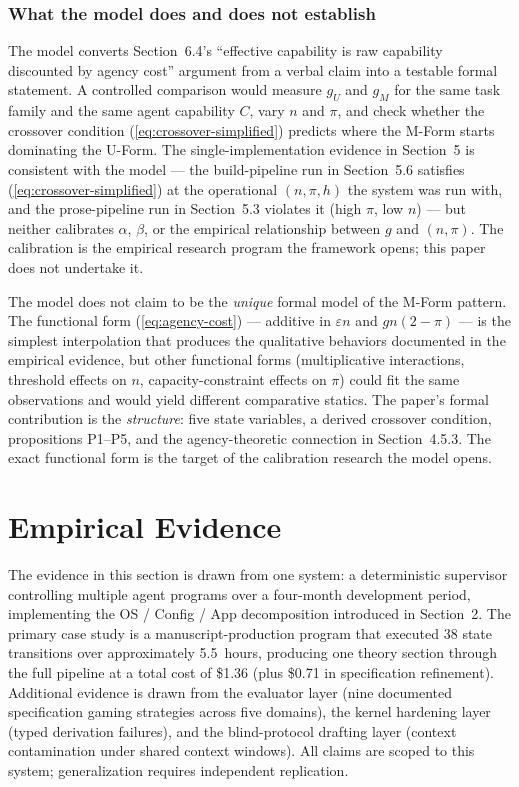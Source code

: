 \documentclass[11pt]{article}
\begin{document}
\subsubsection{What the model does and does not establish}

The model converts Section~6.4's ``effective capability is raw capability discounted by agency cost'' argument from a verbal claim into a testable formal statement. A controlled comparison would measure $g_U$ and $g_M$ for the same task family and the same agent capability $C$, vary $n$ and $\pi$, and check whether the crossover condition (\ref{eq:crossover-simplified}) predicts where the M-Form starts dominating the U-Form. The single-implementation evidence in Section~5 is consistent with the model --- the build-pipeline run in Section~5.6 satisfies (\ref{eq:crossover-simplified}) at the operational $(n, \pi, h)$ the system was run with, and the prose-pipeline run in Section~5.3 violates it (high $\pi$, low $n$) --- but neither calibrates $\alpha$, $\beta$, or the empirical relationship between $g$ and $(n, \pi)$. The calibration is the empirical research program the framework opens; this paper does not undertake it.

The model does not claim to be the \emph{unique} formal model of the M-Form pattern. The functional form (\ref{eq:agency-cost}) --- additive in $\varepsilon n$ and $g n (2 - \pi)$ --- is the simplest interpolation that produces the qualitative behaviors documented in the empirical evidence, but other functional forms (multiplicative interactions, threshold effects on $n$, capacity-constraint effects on $\pi$) could fit the same observations and would yield different comparative statics. The paper's formal contribution is the \emph{structure}: five state variables, a derived crossover condition, propositions P1--P5, and the agency-theoretic connection in Section~4.5.3. The exact functional form is the target of the calibration research the model opens.


\section{Empirical Evidence}

The evidence in this section is drawn from one system: a deterministic supervisor controlling multiple agent programs over a four-month development period, implementing the OS / Config / App decomposition introduced in Section~2. The primary case study is a manuscript-production program that executed 38 state transitions over approximately 5.5~hours, producing one theory section through the full pipeline at a total cost of \$1.36 (plus \$0.71 in specification refinement). Additional evidence is drawn from the evaluator layer (nine documented specification gaming strategies across five domains), the kernel hardening layer (typed derivation failures), and the blind-protocol drafting layer (context contamination under shared context windows). All claims are scoped to this system; generalization requires independent replication.
\end{document}
